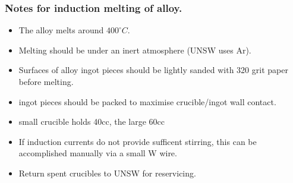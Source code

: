 \subsubsection{Notes for induction melting of \MgZnCa alloy.}
\begin{itemize}
\item The \MgZnCa alloy melts around $400^{\circ}C$.
\item Melting should be under an inert atmosphere (UNSW uses Ar).
\item Surfaces of alloy ingot pieces should be lightly sanded with 320 grit paper before melting.
\item ingot pieces should be packed to maximise crucible/ingot wall contact.
\item small crucible holds 40cc, the large 60cc
\item If induction currents do not provide sufficent stirring, this can be accomplished manually via a small W wire. 
\item Return spent crucibles to UNSW for reservicing. 
\end{itemize}